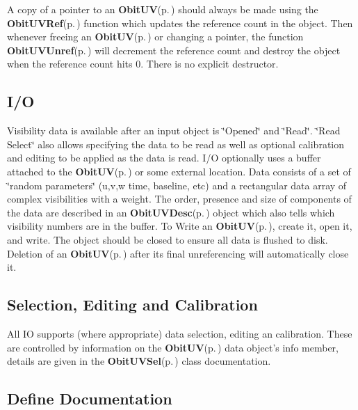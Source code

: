 A copy of a pointer to an {\bf Obit\-UV}{\rm (p.\,\pageref{structObitUV})} should always be made using the {\bf Obit\-UVRef}{\rm (p.\,\pageref{ObitUV_8h_a1})} function which updates the reference count in the object. Then whenever freeing an {\bf Obit\-UV}{\rm (p.\,\pageref{structObitUV})} or changing a pointer, the function {\bf Obit\-UVUnref}{\rm (p.\,\pageref{ObitUV_8h_a0})} will decrement the reference count and destroy the object when the reference count hits 0. There is no explicit destructor.\subsection{I/O}\label{ObitUV_8h_ObitUVUsage}
Visibility data is available after an input object is \char`\"{}Opened\char`\"{} and \char`\"{}Read\char`\"{}. \char`\"{}Read Select\char`\"{} also allows specifying the data to be read as well as optional calibration and editing to be applied as the data is read. I/O optionally uses a buffer attached to the {\bf Obit\-UV}{\rm (p.\,\pageref{structObitUV})} or some external location. Data consists of a set of \char`\"{}random parameters\char`\"{} (u,v,w time, baseline, etc) and a rectangular data array of complex visibilities with a weight. The order, presence and size of components of the data are described in an {\bf Obit\-UVDesc}{\rm (p.\,\pageref{structObitUVDesc})} object which also tells which visibility numbers are in the buffer. To Write an {\bf Obit\-UV}{\rm (p.\,\pageref{structObitUV})}, create it, open it, and write. The object should be closed to ensure all data is flushed to disk. Deletion of an {\bf Obit\-UV}{\rm (p.\,\pageref{structObitUV})} after its final unreferencing will automatically close it.\subsection{Selection, Editing and Calibration}\label{ObitUV_8h_Data}
All IO supports (where appropriate) data selection, editing an calibration. These are controlled by information on the {\bf Obit\-UV}{\rm (p.\,\pageref{structObitUV})} data object's info member, details are given in the {\bf Obit\-UVSel}{\rm (p.\,\pageref{structObitUVSel})} class documentation.

\subsection{Define Documentation}
